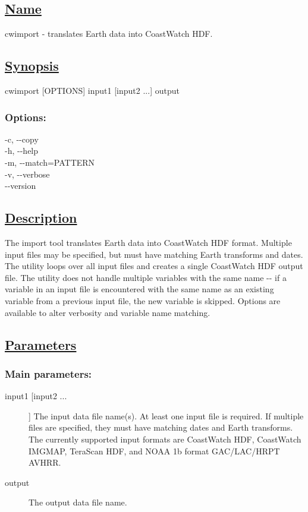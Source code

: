\subsection*{\underline{Name}}


   cwimport - translates Earth data into CoastWatch HDF.  
\subsection*{\underline{Synopsis}}


  cwimport [OPTIONS] input1 [input2 ...] output 
\subsubsection*{Options:}


  -c, -{-}copy \\ 
 -h, -{-}help \\ 
 -m, -{-}match=PATTERN \\ 
 -v, -{-}verbose \\ 
 -{-}version \\ 

\subsection*{\underline{Description}}


  The import tool translates Earth data into CoastWatch HDF format. Multiple input files may be specified, but must have matching Earth transforms and dates. The utility loops over all input files and creates a single CoastWatch HDF output file. The utility does not handle multiple variables with the same name -{-} if a variable in an input file is encountered with the same name as an existing variable from a previous input file, the new variable is skipped. Options are available to alter verbosity and variable name matching. 
\subsection*{\underline{Parameters}}
\subsubsection*{Main parameters:}
\begin{description}
\item[ input1 [input2 ...] ] The input data file name(s). At least one input file is required. If multiple files are specified, they must have matching dates and Earth transforms. The currently supported input formats are CoastWatch HDF, CoastWatch IMGMAP, TeraScan HDF, and NOAA 1b format GAC/LAC/HRPT AVHRR. 
\item[ output ] The output data file name. 

\end{description}
